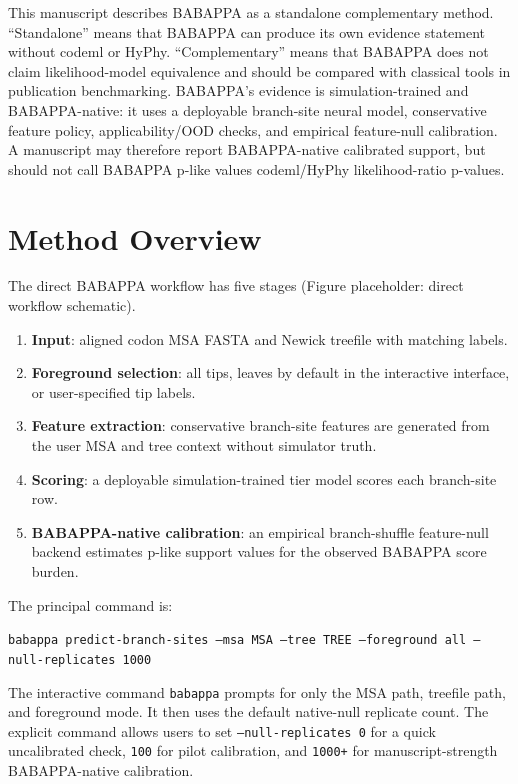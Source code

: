 \documentclass[11pt,a4paper]{article}
\begin{document}
This manuscript describes BABAPPA as a standalone complementary method. ``Standalone'' means that BABAPPA can produce its own evidence statement without codeml or HyPhy. ``Complementary'' means that BABAPPA does not claim likelihood-model equivalence and should be compared with classical tools in publication benchmarking. BABAPPA's evidence is simulation-trained and BABAPPA-native: it uses a deployable branch-site neural model, conservative feature policy, applicability/OOD checks, and empirical feature-null calibration. A manuscript may therefore report BABAPPA-native calibrated support, but should not call BABAPPA p-like values codeml/HyPhy likelihood-ratio p-values.

\section{Method Overview}

The direct BABAPPA workflow has five stages (Figure placeholder: direct workflow schematic).

\begin{enumerate}[leftmargin=*]
  \item \textbf{Input}: aligned codon MSA FASTA and Newick treefile with matching labels.
  \item \textbf{Foreground selection}: all tips, leaves by default in the interactive interface, or user-specified tip labels.
  \item \textbf{Feature extraction}: conservative branch-site features are generated from the user MSA and tree context without simulator truth.
  \item \textbf{Scoring}: a deployable simulation-trained tier model scores each branch-site row.
  \item \textbf{BABAPPA-native calibration}: an empirical branch-shuffle feature-null backend estimates p-like support values for the observed BABAPPA score burden.
\end{enumerate}

The principal command is:

\begin{center}
\texttt{babappa predict-branch-sites --msa MSA --tree TREE --foreground all --null-replicates 1000}
\end{center}

The interactive command \texttt{babappa} prompts for only the MSA path, treefile path, and foreground mode. It then uses the default native-null replicate count. The explicit command allows users to set \texttt{--null-replicates 0} for a quick uncalibrated check, \texttt{100} for pilot calibration, and \texttt{1000+} for manuscript-strength BABAPPA-native calibration.
\end{document}
